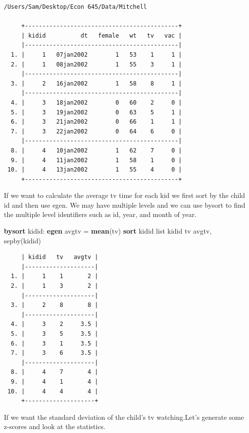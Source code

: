 \documentclass[
]{book}
\newenvironment{Shaded}{\begin{snugshade}}{\end{snugshade}}
\newcommand{\KeywordTok}[1]{\textcolor[rgb]{0.13,0.29,0.53}{\textbf{#1}}}
\newcommand{\NormalTok}[1]{#1}
\newcommand{\OtherTok}[1]{\textcolor[rgb]{0.56,0.35,0.01}{#1}}
\begin{document}
\begin{verbatim}
/Users/Sam/Desktop/Econ 645/Data/Mitchell

     +--------------------------------------------+
     | kidid          dt   female   wt   tv   vac |
     |--------------------------------------------|
  1. |     1   07jan2002        1   53    1     1 |
  2. |     1   08jan2002        1   55    3     1 |
     |--------------------------------------------|
  3. |     2   16jan2002        1   58    8     1 |
     |--------------------------------------------|
  4. |     3   18jan2002        0   60    2     0 |
  5. |     3   19jan2002        0   63    5     1 |
  6. |     3   21jan2002        0   66    1     1 |
  7. |     3   22jan2002        0   64    6     0 |
     |--------------------------------------------|
  8. |     4   10jan2002        1   62    7     0 |
  9. |     4   11jan2002        1   58    1     0 |
 10. |     4   13jan2002        1   55    4     0 |
     +--------------------------------------------+
\end{verbatim}

If we want to calculate the average tv time for each kid we first sort by
the child id and then use egen. We may have multiple levels and we can use
bysort to find the multiple level identifiers such as id, year, and month of year.

\begin{Shaded}
\begin{Highlighting}[]
\KeywordTok{bysort}\NormalTok{ kidid: }\KeywordTok{egen}\NormalTok{ avgtv = }\KeywordTok{mean}\NormalTok{(tv)}
\KeywordTok{sort}\NormalTok{ kidid}
\OtherTok{list}\NormalTok{ kidid tv avgtv, sepby(kidid)}
\end{Highlighting}
\end{Shaded}

\begin{verbatim}
     | kidid   tv   avgtv |
     |--------------------|
  1. |     1    1       2 |
  2. |     1    3       2 |
     |--------------------|
  3. |     2    8       8 |
     |--------------------|
  4. |     3    2     3.5 |
  5. |     3    5     3.5 |
  6. |     3    1     3.5 |
  7. |     3    6     3.5 |
     |--------------------|
  8. |     4    7       4 |
  9. |     4    1       4 |
 10. |     4    4       4 |
     +--------------------+
\end{verbatim}

If we want the standard deviation of the child's tv watching.Let's generate some z-scores and look at the statistics.
\end{document}
